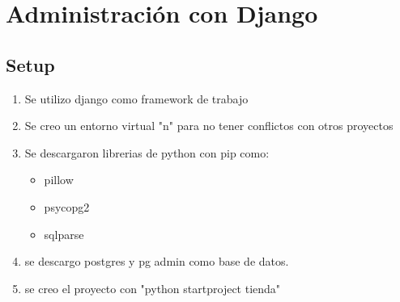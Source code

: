 \documentclass{article}
\begin{document}
 \newpage
	\section{Administración con Django}
	\subsection{Setup}
\begin{enumerate}
	\item Se utilizo django como framework de trabajo
	\item Se creo un entorno virtual "n" para no tener conflictos con otros proyectos
	\item Se descargaron librerias de python con pip como:
		 \begin{itemize}
			 \item pillow
			 \item psycopg2
			 \item sqlparse
		 \end{itemize}
	\item se descargo postgres y pg admin como base de datos.
	\item se creo el proyecto con "python startproject tienda" 
\end{enumerate}
\end{document}

